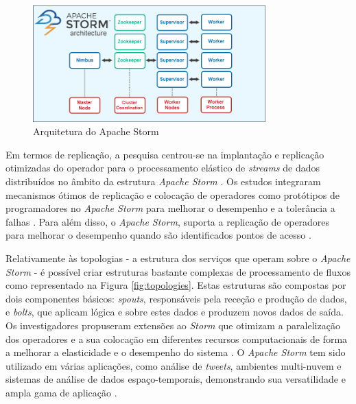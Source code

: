 \begin{figure}[H]
    \centering
    \includegraphics[width=0.8\textwidth]{media/content/estado-arte/apache-storm-architecture.png}
    \caption{Arquitetura do Apache Storm \cite{storm-arch}}
    \label{fig:storm-architecture}
\end{figure}

Em termos de replicação, a pesquisa centrou-se na implantação e replicação otimizadas do 
operador para o processamento elástico de \textit{streams} de dados distribuídos no âmbito 
da estrutura \textit{Apache Storm} \cite{storm2017b}. Os estudos integraram mecanismos ótimos de
replicação e colocação de operadores como protótipos de programadores no \textit{Apache Storm} para
melhorar o desempenho e a tolerância a falhas \cite{storm2017c}. Para além disso, o 
\textit{Apache Storm}, suporta a replicação de operadores para melhorar o desempenho quando são 
identificados pontos de acesso \cite{storm2018c}.

Relativamente às topologias - a estrutura dos serviços que operam sobre o \textit{Apache Storm} - 
é possível criar estruturas bastante complexas de processamento de fluxos como representado na
Figura \ref{fig:topologies}. Estas estruturas são compostas por dois componentes básicos: 
\textit{spouts}, responsáveis pela receção e produção de dados, e \textit{bolts}, que aplicam 
lógica e sobre estes dados e produzem novos dados de saída. Os investigadores propuseram extensões 
ao \textit{Storm} que otimizam a paralelização dos operadores e a sua colocação em diferentes 
recursos computacionais de forma a melhorar a elasticidade e o desempenho do sistema 
\cite{storm2017d} . O \textit{Apache Storm} tem sido utilizado em várias aplicações, como análise 
de \textit{tweets}, ambientes multi-nuvem e sistemas de análise de dados espaço-temporais, 
demonstrando sua versatilidade e ampla gama de aplicação \cite{storm2018d} \cite{storm2020} 
\cite{storm2021}.

